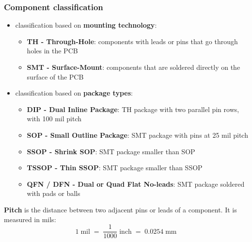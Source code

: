 \subsubsection*{Component classification}
\begin{itemize}[itemsep=5pt]
	\item classification based on \textbf{mounting technology}:
	\begin{itemize}[topsep=0pt]
		\item \textbf{TH - Through-Hole}: components with leads or pins that go through holes in the PCB
		\item \textbf{SMT - Surface-Mount}: components that are soldered directly on the surface of the PCB
	\end{itemize}
	\item classification based on \textbf{package types}:
	\begin{itemize}[topsep=0pt]
		\item \textbf{DIP - Dual Inline Package}: TH package with two parallel pin rows, with 100 mil pitch
		\item \textbf{SOP - Small Outline Package}: SMT package with pins at 25 mil pitch
		\item \textbf{SSOP - Shrink SOP}: SMT package smaller than SOP
		\item \textbf{TSSOP - Thin SSOP}: SMT package smaller than SSOP
		\item \textbf{QFN / DFN - Dual or Quad Flat No-leads}: SMT package soldered with pads or balls
	\end{itemize}
\end{itemize}

\vspace{5pt}

\textbf{Pitch} is the distance between two adjacent pins or leads of a component. It is measured in mils:
\[1 \; \text{mil} \; = \; \frac{1}{1000} \; \text{inch} \; = \; 0.0254 \;\text{mm}\]


